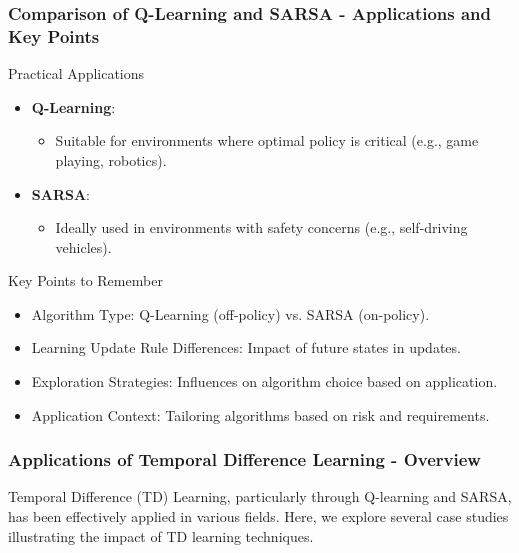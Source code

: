 \documentclass[aspectratio=169]{beamer}
\begin{document}
\begin{frame}[fragile]
    \frametitle{Comparison of Q-Learning and SARSA - Applications and Key Points}
    \begin{block}{Practical Applications}
        \begin{itemize}
            \item \textbf{Q-Learning}:
                \begin{itemize}
                    \item Suitable for environments where optimal policy is critical (e.g., game playing, robotics).
                \end{itemize}
            \item \textbf{SARSA}:
                \begin{itemize}
                    \item Ideally used in environments with safety concerns (e.g., self-driving vehicles).
                \end{itemize}
        \end{itemize}
    \end{block}
    
    \begin{block}{Key Points to Remember}
        \begin{itemize}
            \item Algorithm Type: Q-Learning (off-policy) vs. SARSA (on-policy).
            \item Learning Update Rule Differences: Impact of future states in updates.
            \item Exploration Strategies: Influences on algorithm choice based on application.
            \item Application Context: Tailoring algorithms based on risk and requirements.
        \end{itemize}
    \end{block}
\end{frame}

\begin{frame}[fragile]
    \frametitle{Applications of Temporal Difference Learning - Overview}
    Temporal Difference (TD) Learning, particularly through Q-learning and SARSA, has been effectively applied in various fields. Here, we explore several case studies illustrating the impact of TD learning techniques.
\end{frame}
\end{document}
